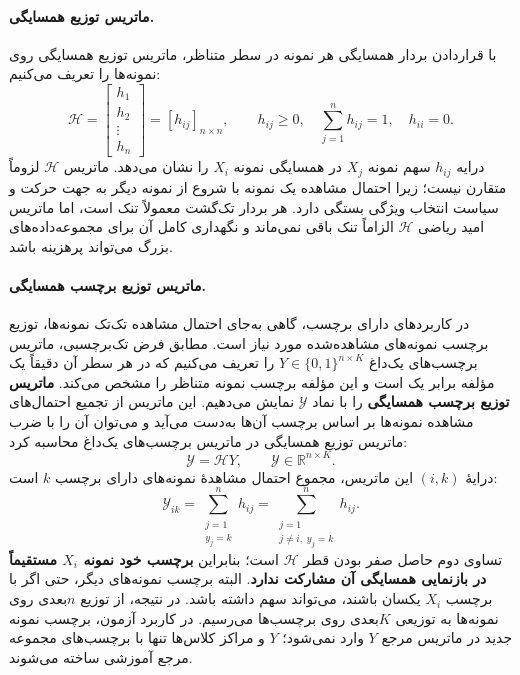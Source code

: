 \paragraph{ماتریس توزیع همسایگی.}
با قراردادن بردار همسایگی هر نمونه در سطر متناظر، ماتریس توزیع همسایگی روی نمونه‌ها را تعریف می‌کنیم:
\begin{equation}\label{eq:ch3-H}
\mathscr H=
\begin{bmatrix}h_1\\h_2\\\vdots\\h_n\end{bmatrix}
=[h_{ij}]_{n\times n},
\qquad h_{ij}\ge0,\quad
\sum_{j=1}^{n}h_{ij}=1,\quad h_{ii}=0.
\end{equation}
درایه $h_{ij}$ سهم نمونه $X_j$ در همسایگی نمونه $X_i$ را نشان می‌دهد. ماتریس $\mathscr H$ لزوماً متقارن نیست؛ زیرا احتمال مشاهده یک نمونه با شروع از نمونه دیگر به جهت حرکت و سیاست انتخاب ویژگی بستگی دارد. هر بردار تک‌گشت معمولاً تنک است، اما ماتریس امید ریاضی $\mathscr H$ الزاماً تنک باقی نمی‌ماند و نگهداری کامل آن برای مجموعه‌داده‌های بزرگ می‌تواند پرهزینه باشد.

\paragraph{ماتریس توزیع برچسب همسایگی.}
در کاربردهای دارای برچسب، گاهی به‌جای احتمال مشاهده تک‌تک نمونه‌ها، توزیع برچسب نمونه‌های مشاهده‌شده مورد نیاز است. مطابق فرض تک‌برچسبی، ماتریس برچسب‌های یک‌داغ $Y\in\{0,1\}^{n\times K}$ را تعریف می‌کنیم که در هر سطر آن دقیقاً یک مؤلفه برابر یک است و این مؤلفه برچسب نمونه متناظر را مشخص می‌کند. \textbf{ماتریس توزیع برچسب همسایگی} را با نماد $\mathscr Y$ نمایش می‌دهیم. این ماتریس از تجمیع احتمال‌های مشاهده نمونه‌ها بر اساس برچسب آن‌ها به‌دست می‌آید و می‌توان آن را با ضرب ماتریس توزیع همسایگی در ماتریس برچسب‌های یک‌داغ محاسبه کرد:
\begin{equation}\label{eq:ch3-Y-script}
\boxed{\mathscr Y=\mathscr H Y},
\qquad \mathscr Y\in\mathbb R^{n\times K}.
\end{equation}
درایهٔ $(i,k)$ این ماتریس، مجموع احتمال مشاهدهٔ نمونه‌های دارای برچسب $k$ است:
\begin{equation}\label{eq:ch3-Y-script-entry}
\mathscr Y_{ik}=\sum_{\substack{j=1\\ y_j=k}}^{n}h_{ij}
=\sum_{\substack{j=1\\ j\ne i,\;y_j=k}}^{n}h_{ij}.
\end{equation}
تساوی دوم حاصل صفر بودن قطر $\mathscr H$ است؛ بنابراین \textbf{برچسب خود نمونه $X_i$ مستقیماً در بازنمایی همسایگی آن مشارکت ندارد}. البته برچسب نمونه‌های دیگر، حتی اگر با برچسب $X_i$ یکسان باشند، می‌تواند سهم داشته باشد. در نتیجه، از توزیع $n$بعدی روی نمونه‌ها به توزیعی $K$بعدی روی برچسب‌ها می‌رسیم. در کاربرد آزمون، برچسب نمونه جدید در ماتریس مرجع $Y$ وارد نمی‌شود؛ $Y$ و مراکز کلاس‌ها تنها با برچسب‌های مجموعه مرجع آموزشی ساخته می‌شوند.

